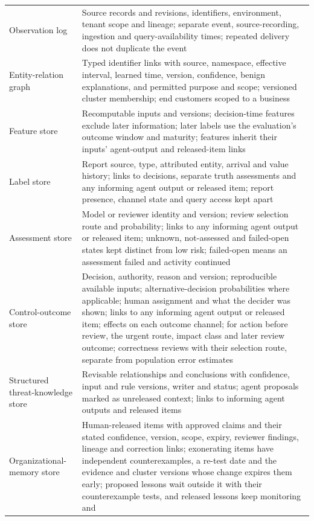 \documentclass[
  11pt,
]{article}
\begin{document}
\begin{table}[tp]
{\begin{tabular}{@{}
  >{\raggedright\arraybackslash}p{}
  >{\raggedright\arraybackslash}p{}@{}}
Observation log & Source records and revisions, identifiers,
environment, tenant scope and lineage; separate event, source-recording,
ingestion and query-availability times; repeated delivery does not
duplicate the event \\
Entity-relation graph & Typed identifier links with source, namespace,
effective interval, learned time, version, confidence, benign
explanations, and permitted purpose and scope; versioned cluster
membership; end customers scoped to a business \\
Feature store & Recomputable inputs and versions; decision-time features
exclude later information; later labels use the evaluation's outcome
window and maturity; features inherit their inputs' agent-output and
released-item links \\
Label store & Report source, type, attributed entity, arrival and value
history; links to decisions, separate truth assessments and any
informing agent output or released item; report presence, channel state
and query access kept apart \\
Assessment store & Model or reviewer identity and version; review
selection route and probability; links to any informing agent output or
released item; unknown, not-assessed and failed-open states kept
distinct from low risk; failed-open means an assessment failed and
activity continued \\
Control-outcome store & Decision, authority, reason and version;
reproducible available inputs; alternative-decision probabilities where
applicable; human assignment and what the decider was shown; links to
any informing agent output or released item; effects on each outcome
channel; for action before review, the urgent route, impact class and
later review outcome; correctness reviews with their selection route,
separate from population error estimates \\
Structured threat-knowledge store & Revisable relationships and
conclusions with confidence, input and rule versions, writer and status;
agent proposals marked as unreleased context; links to informing agent
outputs and released items \\
Organizational-memory store & Human-released items with approved claims
and their stated confidence, version, scope, expiry, reviewer findings,
lineage and correction links; exonerating items have independent
counterexamples, a re-test date and the evidence and cluster versions
whose change expires them early; proposed lessons wait outside it with
their counterexample tests, and released lessons keep monitoring and

\end{tabular}}
\end{table}
\end{document}
